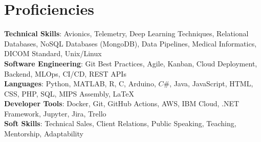 \documentclass[letterpaper,11.5pt]{article}
\def\proficiencySpace{3pt}
\begin{document}
\section{Proficiencies}
\vspace{2pt}
 \begin{itemize}[leftmargin=0.15in, label={}]
    \small{\item{
     \textbf{Technical Skills}{: Avionics, Telemetry, Deep Learning Techniques, Relational Databases, NoSQL Databases (MongoDB), Data Pipelines, Medical Informatics, DICOM Standard, Unix/Linux} \vspace{\proficiencySpace} \\ 
     \textbf{Software Engineering}{: Git Best Practices, Agile, Kanban, Cloud Deployment, Backend, MLOps, CI/CD, REST APIs} \vspace{\proficiencySpace} \\ 
     \textbf{Languages}{: Python, MATLAB, R, C, Arduino, $C\#$, Java, JavaScript, HTML, CSS, PHP, SQL, MIPS Assembly, LaTeX} \vspace{\proficiencySpace} \\
     \textbf{Developer Tools}{: Docker, Git, GitHub Actions, AWS, IBM Cloud, .NET Framework, Jupyter, Jira, Trello} \vspace{\proficiencySpace} \\
     \textbf{Soft Skills}{: Technical Sales, Client Relations, Public Speaking, Teaching, Mentorship, Adaptability}
    }}
 \end{itemize}
\end{document}
